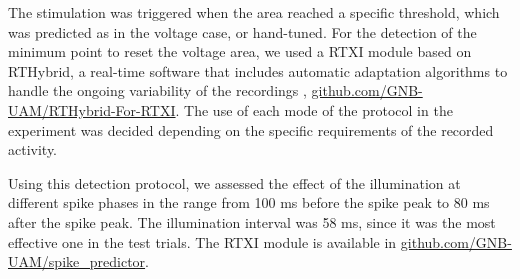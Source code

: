 The stimulation was triggered when the area reached a specific threshold, which was predicted as in the voltage case, or hand-tuned. For the detection of the minimum point to reset the voltage area, we used a RTXI module based on RTHybrid, a real-time software that includes automatic adaptation algorithms to handle the ongoing variability of the recordings \cite{Amaducci2019,Reyes-Sanchez2020,REYESSANCHEZ2023}, \href{https://github.com/GNB-UAM/rthybrid-for-rtxi/tree/master/rthybrid_burst_analysis}{github.com/GNB-UAM/RTHybrid-For-RTXI}. The use of each mode of the protocol in the experiment was decided depending on the specific requirements of the recorded activity. 


Using this detection protocol, we assessed the effect of the illumination at different spike phases in the range from 100 ms before the spike peak to 80 ms after the spike peak. The illumination interval was 58 ms, since it was the most effective one in the test trials. The RTXI module is available in \href{https://github.com/GNB-UAM/spike_predictor}{github.com/GNB-UAM/spike\_predictor}.

